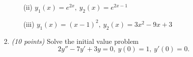 \documentclass[12pt]{article}
\begin{document}
\begin{enumerate}
\begin{enumerate}
\begin{enumerate}
\item[(ii)]
$y_1(x) = e^{2x}, \ y_2 (x) = e^{2x-1}$

\item[(iii)]
$y_1(x) = (x-1)^2, \ y_2(x) = 3x^2-9x+3$
\end{enumerate}

\vspace*{2in}

\item
{\em (10 points)}
Solve the initial value problem
$$
2y'' - 7y' + 3y = 0, \ y(0) = 1, \ y'(0) = 0.
$$

\end{enumerate}

\end{enumerate}
\end{document}
